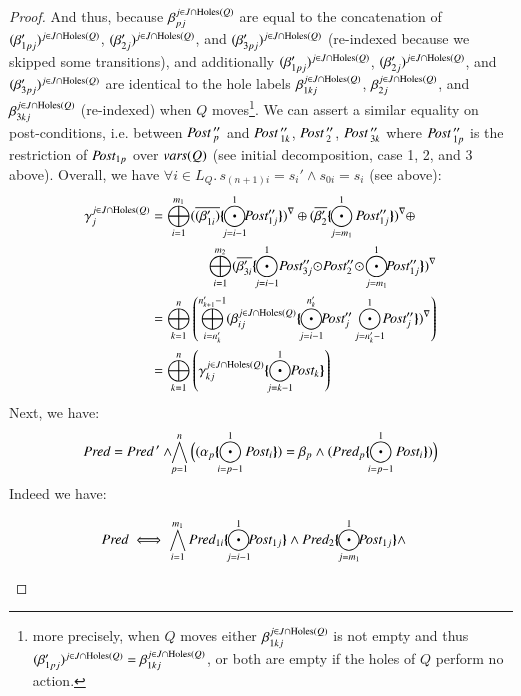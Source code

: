 \documentclass{elsarticle}
\newcommand{\shortodot}{\!\odot\!}
\begin{document}
\begin{proof}
And thus, because $\beta_{pj}^{j\in J\cap \operatorname{Holes}(Q)}$ are equal to the concatenation of  $(\beta'_{1pj})^{j\in J\cap \operatorname{Holes}(Q)}$, $(\beta'_{2j})^{j\in J\cap \operatorname{Holes}(Q)}$, and $(\beta_{3pj}')^{j\in J\cap \operatorname{Holes}(Q)}$ (re-indexed because we skipped some transitions), and additionally $(\beta_{1pj}')^{j\in J\cap \operatorname{Holes}(Q)}$, $(\beta_{2j}')^{j\in J\cap \operatorname{Holes}(Q)}$, and $(\beta_{3pj}')^{j\in J\cap \operatorname{Holes}(Q)}$ are identical to the hole labels $\beta_{1kj}^{j\in J\cap \operatorname{Holes}(Q)}$, $\beta_{2j}^{j\in J\cap \operatorname{Holes}(Q)}$, and $\beta_{3kj}^{j\in J\cap \operatorname{Holes}(Q)}$ (re-indexed) when $Q$ moves\footnote{more precisely, when $Q$ moves either $\beta_{1kj}^{j\in J\cap \operatorname{Holes}(Q)}$ is not empty  and thus $(\beta_{1pj}')^{j\in J\cap \operatorname{Holes}(Q)}=\beta_{1kj}^{j\in J\cap \operatorname{Holes}(Q)}$, or both are empty if the holes of $Q$ perform no action.}. We can assert a similar equality on post-conditions, i.e. between $\Post\,''_p$ and $\Post\,''_{1k}$, $\Post\,''_{2}$, $\Post\,''_{3k}$ where $\Post\,''_{1p}$ is the restriction of $\Post_{1p}$ over $\vars(Q)$ (see initial decomposition, case 1, 2, and 3 above). Overall, we have
$\forall i \in L_Q.\, s_{(n+1) i} = s_i'\land s_{0 i} = s_i$ (see above):\\
{\scriptsize \begin{equation*}
\begin{split}
\gamma_j^{j\in J\cap \Holes(Q)}&=\bigoplus_{i=1}^{m_1} \vis{\set{(\beta_{1i}')}\subst{\bigodot_{j=i-1}^{1}\!\! \Post''_{1j}}}\oplus  \vis{\set{\beta'_2}\subst{\bigodot_{j=m_1}^{1}\Post''_{1j}}} \oplus\\&\qquad\qquad \bigoplus_{i=1}^{m_2} \vis{\set{\beta'_{3i}} \subst{\bigodot_{j=i-1}^{1}\!\Post''_{3j}\shortodot\Post''_2\shortodot\bigodot_{j=m_1}^{1}\!\!\Post''_{1j}} }\\
&=\bigoplus_{k=1}^n \left( \bigoplus_{i=n'_k}^{n'_{k+1}-1}\vis{\beta_{ij}^{j\in J\cap \Holes(Q)}\subst{\bigodot_{j=i-1}^{n'_k}\!\!\Post''_{j}\bigodot_{j=n'_k-1}^{1}\!\!\Post''_{j}}}\right)\\
&=\bigoplus_{k=1}^n \left( \gamma_{kj}^{j\in J\cap \Holes(Q)}\subst{\bigodot_{j=k-1}^{1}\!\!\Post_{k}}\right)
\end{split}\end{equation*}
}
Next, we have:
\[\Pred = \displaystyle{\Pred\,'
		\land \!\!\bigwedge_{p=1}^n\Big((\alpha_p\subst{\bigodot_{i=p-1}^{1}\Post_i}) = \beta_p\land (\Pred_p\subst{\bigodot_{i=p-1}^{1}\Post_i}) \Big)}\]
Indeed we have:
\begin{scriptsize}
\begin{align*}
\Pred&\iff\bigwedge_{i=1}^{m_1}\Pred_{1i}\subst{\bigodot_{j=i-1}^{1}\!\!\Post_{1j}}\land\Pred_2 \subst{\bigodot_{j=m_1}^{1}\!\!\Post_{1j}}\land

\end{align*}
\end{scriptsize}
\end{proof}
\end{document}
